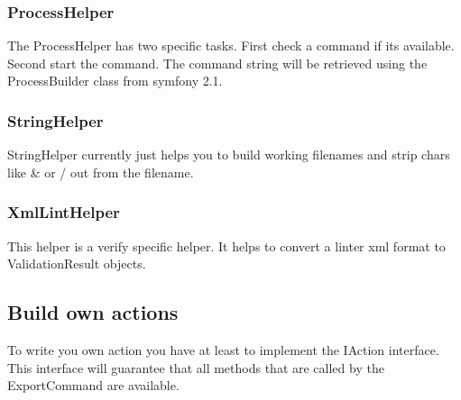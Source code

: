 \noindent
\begin{minipage}{\textwidth}
\vspace{1.5em}
\subsubsection{ProcessHelper}
The ProcessHelper has two specific tasks. First check a command if its available. Second start the command. The command string will be retrieved using the ProcessBuilder class from symfony 2.1.
\end{minipage}

\noindent
\begin{minipage}{\textwidth}
\vspace{1.5em}
\subsubsection{StringHelper}
StringHelper currently just helps you to build working filenames and strip chars like \& or / out from the filename.
\end{minipage}

\noindent
\begin{minipage}{\textwidth}
\vspace{1.5em}
\subsubsection{XmlLintHelper}
This helper is a verify specific helper. It helps to convert a linter xml format to ValidationResult objects.
\end{minipage}

\subsection{Build own actions}
To write you own action you have at least to implement the IAction interface. This interface will guarantee that all methods that are called by the ExportCommand are available.

